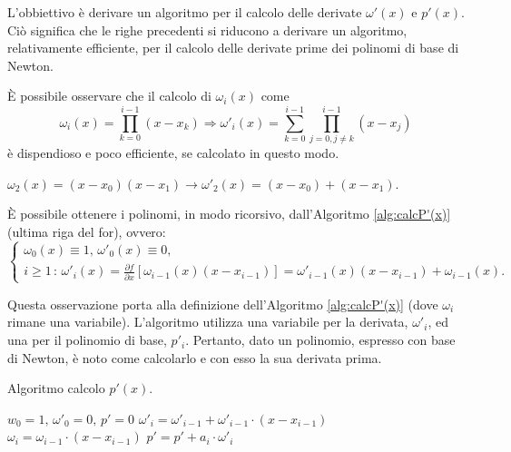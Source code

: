 L'obbiettivo è derivare un algoritmo per il calcolo delle derivate $\omega'(x)$ e $p'(x)$. Ciò significa che le righe precedenti si riducono a derivare un algoritmo, relativamente efficiente, per il calcolo delle derivate prime dei polinomi di base di Newton.

È possibile osservare che il calcolo di $\omega_i(x)$ come
\begin{equation*}
    \omega_i(x)=\prod_{k=0}^{i-1}(x-x_k)\Rightarrow \omega'_i(x)=\sum_{k=0}^{i-1}\prod_{j=0,j\neq k}^{i-1}(x-x_j)
\end{equation*}
è dispendioso e poco efficiente, se calcolato in questo modo.

\begin{example}
    $\omega_2(x)=(x-x_0)(x-x_1) \rightarrow \omega'_2(x)=(x-x_0)+(x-x_1)$.
\end{example}

\begin{remark}
    È possibile ottenere i polinomi, in modo ricorsivo, dall'Algoritmo \ref{alg:calcP'(x)} (ultima riga del for), ovvero:
    \begin{equation*}
        \begin{cases}
            \omega_0(x)\equiv 1,\, \omega'_0(x)\equiv 0,\\
            i\geq 1\,:\, \omega'_i(x)=\frac{\partial f}{\partial x}[\omega_{i-1}(x)(x-x_{i-1})] = \omega'_{i-1}(x)(x-x_{i-1})+\omega_{i-1}(x).
        \end{cases}
    \end{equation*}
\end{remark}

Questa osservazione porta alla definizione dell'Algoritmo \ref{alg:calcP'(x)} (dove $\omega_i$ rimane una variabile). L'algoritmo utilizza una variabile per la derivata, $\omega'_i$, ed una per il polinomio di base, $p'_i$. Pertanto, dato un polinomio, espresso con base di Newton, è noto come calcolarlo e con esso la sua derivata prima.

\begin{algorithm}\caption{Algoritmo calcolo $p'(x)$.}\label{alg:calcP'(x)}
    \begin{algorithmic}
        \State $w_0=1,\, \omega'_0=0,\, p'=0$
            \State $\omega'_i=\omega'_{i-1}+\omega'_{i-1}\cdot (x-x_{i-1})$
            \State $\omega_i=\omega_{i-1}\cdot(x-x_{i-1})$
            \State $p'=p'+a_i\cdot\omega'_i$
        \EndFor
    \end{algorithmic}
\end{algorithm}

